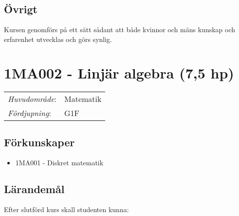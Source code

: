\subsection*{Övrigt}

Kursen genomförs på ett sätt sådant att både kvinnor och mäns kunskap och erfarenhet utvecklas och görs synlig.
\pagebreak

\section*{1MA002 - Linjär algebra (7,5 hp)}

\begin{tabular}{ll}\emph{Huvudområde}: & Matematik\tabularnewline\emph{Fördjupning}: & G1F\tabularnewline\end{tabular}

\subsection*{Förkunskaper}

\begin{itemize}
\tightlist
\item
  1MA001 - Diskret matematik
\end{itemize}

\subsection*{Lärandemål}

Efter slutförd kurs skall studenten kunna:

